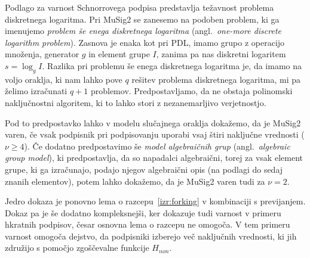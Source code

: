 Podlago za varnost Schnorrovega podpisa predstavlja težavnost problema diskretnega logaritma. Pri
MuSig2 se zanesemo na podoben problem, ki ga imenujemo \textit{problem še enega diskretnega logaritma}
(angl.\ \textit{one-more discrete logarithm problem}). Zasnova je enaka kot pri PDL, imamo grupo z
operacijo množenja, generator $g$ in element grupe $I$, zanima pa nas diskretni logaritem
$s = \log_g I$. Razlika pri problemu še enega diskretnega logaritma je, da imamo na voljo oraklja,
ki nam lahko pove $q$ rešitev problema diskretnega logaritma, mi pa želimo izračunati $q + 1$ problemov.
Predpostavljamo, da ne obstaja polinomski naključnostni algoritem, ki to lahko stori z nezanemarljivo
verjetnostjo.

Pod to predpostavko lahko v modelu slučajnega oraklja dokažemo, da je MuSig2 varen, če vsak podpisnik
pri podpisovanju uporabi vsaj štiri naključne vrednosti ($\nu \geq 4$). Če dodatno predpostavimo še
\textit{model algebraičnih grup} (angl.\ \textit{algebraic group model}), ki predpostavlja, da so
napadalci algebraični, torej za vsak element grupe, ki ga izračunajo, podajo njegov algebraični
opis (na podlagi do sedaj znanih elementov), potem lahko dokažemo, da je MuSig2 varen tudi za $\nu = 2$.

Jedro dokaza je ponovno lema o razcepu~\ref{izr:forking} v kombinaciji s previjanjem. Dokaz pa je še
dodatno kompleksnejši, ker dokazuje tudi varnost v primeru hkratnih podpisov, česar osnovna lema
o razcepu ne omogoča. V tem primeru varnost omogoča dejstvo, da podpisniki izberejo več naključnih
vrednosti, ki jih združijo s pomočjo zgoščevalne funkcije $H_{non}$.
